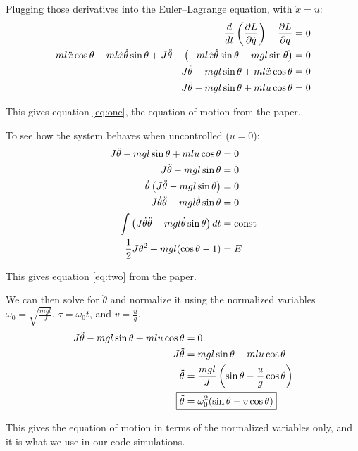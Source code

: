 \documentclass{article}
\begin{document}
Plugging those derivatives into the Euler--Lagrange equation, with $\ddot{x} = u$:
\begin{align}
    \frac{d}{dt}\left(\frac{\partial L}{\partial \dot{q}}\right) - \frac{\partial L}{\partial q} &= 0 \notag \\
    ml\ddot{x}\cos{\theta} - ml\dot{x}\dot{\theta}\sin{\theta} + J\ddot{\theta} - \left(-ml\dot{x}\dot{\theta}\sin{\theta} + mgl\sin{\theta}\right) &= 0 \notag \\
    J\ddot{\theta} -mgl\sin{\theta} + ml\ddot{x}\cos{\theta} &= 0 \notag \\
    J\ddot{\theta} -mgl\sin{\theta} + mlu\cos{\theta} &= 0 \label{eq:one}
\end{align}

This gives equation \eqref{eq:one}, the equation of motion from the paper.

To see how the system behaves when uncontrolled ($u=0$):
\begin{align}
    J\ddot{\theta} -mgl\sin{\theta} + mlu\cos{\theta} &= 0 \notag \\
    J\ddot{\theta} -mgl\sin{\theta} &= 0 \notag \\
    \dot{\theta} \left(J\ddot{\theta} -mgl\sin{\theta}\right) &= 0 \notag \\
     J\dot{\theta}\ddot{\theta} -mgl\dot{\theta}\sin{\theta} &= 0 \notag \\
     \int{\left(J\dot{\theta}\ddot{\theta} -mgl\dot{\theta}\sin{\theta}\right) dt} &= \text{const} \notag \\
     \frac{1}{2}J\dot{\theta}^2 + mgl(\cos{\theta} - 1) &= E \label{eq:two}
\end{align}

This gives equation \eqref{eq:two} from the paper.

We can then solve for $\ddot{\theta}$ and normalize it using the normalized variables $\omega_0 = \sqrt{\frac{mgl}{J}}$, $\tau = \omega_0 t$, and $v = \frac{u}{g}$.
\begin{align*}
    J\ddot{\theta} -mgl\sin{\theta} + mlu\cos{\theta} &= 0 \\
    J\ddot{\theta} &= mgl\sin{\theta} - mlu\cos{\theta} \\
    \ddot{\theta} &= \frac{mgl}{J} \left(\sin{\theta} - \frac{u}{g}\cos{\theta}\right) \\
    \Aboxed{\ddot{\theta} &= \omega_0^2(\sin{\theta} - v\cos{\theta})}
\end{align*}

This gives the equation of motion in terms of the normalized variables only, and it is what we use in our code simulations.
\end{document}
